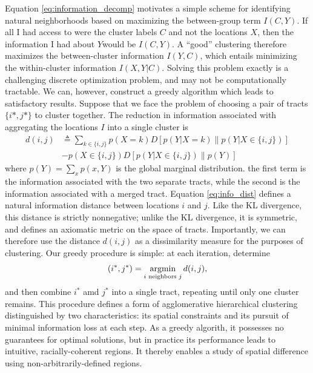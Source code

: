 	Equation \eqref{eq:information_decomp} motivates a simple scheme for identifying natural neighborhoods based on maximizing the between-group term $I(C,Y)$. If all I had access to were the cluster labels $C$ and not the locations $X$, then the information I had about $Y$would be $I(C,Y)$. A ``good'' clustering therefore maximizes the between-cluster information $I(Y,C)$, which entails minimizing the within-cluster information $I(X,Y|C)$. Solving this problem exactly is a challenging discrete optimization problem, and may not be computationally tractable. We can, however, construct a greedy algorithm which leads to satisfactory results. Suppose that we face the problem of choosing a pair of tracts $\{i*,j*\}$ to cluster together. The reduction in information associated with aggregating the locations $I$ into a single cluster is 
	\begin{align}
		d(i,j) &\triangleq  \sum_{k \in \{i,j\}} p(X = k)D[p(Y|X = k)\| p(Y|X \in \{i,j\})] \\
		&- p(X\in \{i,j\})D[p(Y|X\in \{i,j\}) \| p(Y)] \label{eq:info_dist}
	\end{align}
	where $p(Y) = \sum_{x} p(x,Y)$ is the global marginal distribution. the first term is the information associated with the two separate tracts, while the second is the information associated with a merged tract. Equation \eqref{eq:info_dist} defines a natural information distance between locations $i$ and $j$. Like the KL divergence, this distance is strictly nonnegative; unlike the KL divergence, it is symmetric, and defines an axiomatic metric on the space of tracts. Importantly, we can therefore use the distance $d(i,j)$ as a dissimilarity measure for the purposes of clustering. Our greedy procedure is simple: at each iteration, determine
	\begin{equation}
		(i^*,j^*) = \argmin_{i \text{ neighbors } j} d(i,j),
	\end{equation}
	and then combine $i^*$ amd $j^*$ into a single tract, repeating until only one cluster remains. This procedure defines a form of agglomerative hierarchical clustering distinguished by two characteristics: its spatial constraints and its pursuit of minimal information loss at each step. As a greedy algorith, it possesses no guarantees for optimal solutions, but in practice its performance leads to intuitive, racially-coherent regions. It thereby enables a study of spatial difference using non-arbitrarily-defined regions. 






